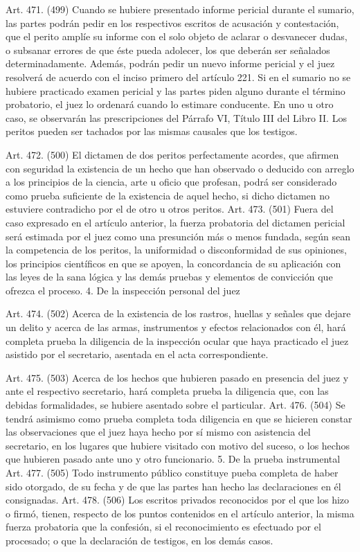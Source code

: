     Art. 471. (499) Cuando se hubiere presentado informe pericial durante el sumario, las partes podrán pedir en los respectivos escritos de acusación y contestación, que el perito amplíe su informe con el solo objeto de aclarar o desvanecer dudas, o subsanar errores de que éste pueda adolecer, los que deberán ser señalados determinadamente.
    Además, podrán pedir un nuevo informe pericial y el juez resolverá de acuerdo con el inciso primero del artículo 221.
    Si en el sumario no se hubiere practicado examen pericial y las partes piden alguno durante el término probatorio, el juez lo ordenará cuando lo estimare conducente.
    En uno u otro caso, se observarán las prescripciones del Párrafo VI, Título III del Libro II.
    Los peritos pueden ser tachados por las mismas causales que los testigos.

    Art. 472. (500) El dictamen de dos peritos perfectamente acordes, que afirmen con seguridad la existencia de un hecho que han observado o deducido con arreglo a los principios de la ciencia, arte u oficio que profesan, podrá ser considerado como prueba suficiente de la existencia de aquel hecho, si dicho dictamen no estuviere contradicho por el de otro u otros peritos.
    Art. 473. (501) Fuera del caso expresado en el artículo anterior, la fuerza probatoria del dictamen pericial será estimada por el juez como una presunción más o menos fundada, según sean la competencia de los peritos, la uniformidad o disconformidad de sus opiniones, los principios científicos en que se apoyen, la concordancia de su aplicación con las leyes de la sana lógica y las demás pruebas y elementos de convicción que ofrezca el proceso.
    4. De la inspección personal del juez

    Art. 474. (502) Acerca de la existencia de los rastros, huellas y señales que dejare un delito y acerca de las armas, instrumentos y efectos relacionados con él, hará completa prueba la diligencia de la inspección ocular que haya practicado el juez asistido por el secretario, asentada en el acta correspondiente.


    Art. 475. (503) Acerca de los hechos que hubieren pasado en presencia del juez y ante el respectivo secretario, hará completa prueba la diligencia que, con las debidas formalidades, se hubiere asentado sobre el particular.
    Art. 476. (504) Se tendrá asimismo como prueba completa toda diligencia en que se hicieren constar las observaciones que el juez haya hecho por sí mismo con asistencia del secretario, en los lugares que hubiere visitado con motivo del suceso, o los hechos que hubieren pasado ante uno y otro funcionario.
    5. De la prueba instrumental
    Art. 477. (505) Todo instrumento público constituye pueba completa de haber sido otorgado, de su fecha y de que las partes han hecho las declaraciones en él consignadas.
    Art. 478. (506) Los escritos privados reconocidos por el que los hizo o firmó, tienen, respecto de los puntos contenidos en el artículo anterior, la misma fuerza probatoria que la confesión, si el reconocimiento es efectuado por el procesado; o que la declaración de testigos, en los demás casos.



